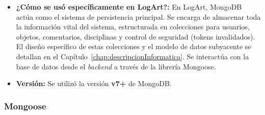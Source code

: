 \begin{itemize}
\begin{itemize}
            \item \textit{Integración Nativa con JavaScript/Node.js:} Almacenar datos en un formato similar a JSON (BSON) facilita la interacción desde las propias aplicaciones JavaScript/Node.js, ya que los datos pueden mapearse de forma natural a objetos JavaScript sin necesidad de transformaciones ORM (Object-Relational Mapping). Sin embargo, para añadir estructura, validación y una capa más de modelado más robusta, se utilizó Mongoose, una librería ODM (Object Data Modeling) que permite definir esquemas y modelos en Node.js sobre MongoDB.
            \item \textit{Comunidad y Ecosistema:} MongoDB cuenta con una amplia comunidad, extensiva documentación y herramientas de desarrollo como las ya mencionadas anteriormente (MongoDB Compass y Atlas) que facilitan su uso.
        \end{itemize}
    \item \textbf{¿Cómo se usó específicamente en LogArt?:}
    En LogArt, MongoDB actúa como el sistema de persistencia principal. Se encarga de almacenar toda la información vital del sistema, estructurada en colecciones para usuarios, objetos, comentarios, disciplinas y control de seguridad (tokens invalidados). El diseño específico de estas colecciones y el modelo de datos subyacente se detallan en el Capítulo~\ref{chap:descripcionInformatica}. Se interactúa con la base de datos desde el \textit{backend} a través de la librería Mongoose.
    \item \textbf{Versión:} Se utilizó la versión \textbf{v7+} de MongoDB.
\end{itemize}

\subsubsection{Mongoose}
\label{sec:mongoose}

